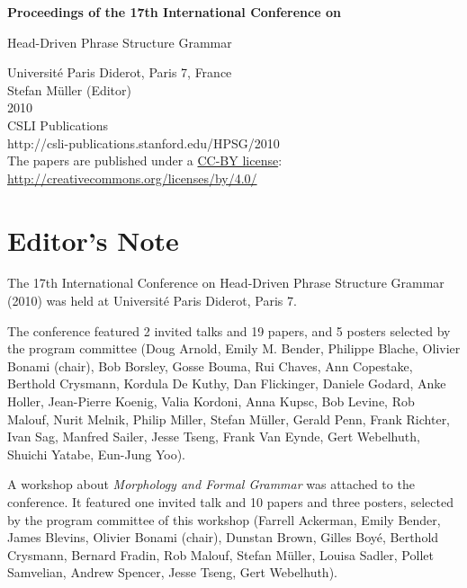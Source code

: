 \documentclass[11pt,a4paper,fleqn]{article}
\begin{document}
\begin{center}
{\Large
                {\bfseries Proceedings of the 17th International Conference on\par Head-Driven Phrase Structure Grammar\par}

                \vspace{8ex}

                     Universit{\'e} Paris Diderot, Paris 7, France\\[\baselineskip]

                        Stefan M{\"u}ller (Editor)\\[\baselineskip]

                                2010\\[\baselineskip]

                          CSLI Publications\\[\baselineskip]

              http://csli-publications.stanford.edu/HPSG/2010 \\[4\baselineskip]

The papers are published under a \href{http://creativecommons.org/licenses/by/4.0/}{CC-BY license}:\\[3pt]
\href{http://creativecommons.org/licenses/by/4.0/}{http://creativecommons.org/licenses/by/4.0/}
}
\end{center}
\newpage
\tableofcontents

\newpage

\section{Editor's Note}
The 17th International Conference on Head-Driven Phrase Structure Grammar (2010) was held at Université Paris Diderot, Paris 7.

The conference featured 2 invited talks and 19 papers, and 5 posters selected by the program committee (Doug Arnold,
Emily M. Bender, Philippe Blache, Olivier Bonami (chair), Bob Borsley, Gosse Bouma, Rui Chaves, Ann
Copestake,
Berthold Crysmann, Kordula De Kuthy, Dan Flickinger, Daniele Godard, Anke Holler, Jean-Pierre
Koenig, Valia Kordoni, Anna Kupsc, Bob Levine, Rob Malouf, Nurit Melnik, Philip Miller, Stefan
Müller, Gerald Penn, Frank Richter, Ivan Sag, Manfred Sailer, Jesse Tseng, Frank Van Eynde, Gert
Webelhuth, Shuichi Yatabe, Eun-Jung Yoo).

A workshop about \emph{Morphology and Formal Grammar}
was attached to the conference. It featured one invited talk and 10 papers and three posters, selected by the program
committee of this workshop (Farrell Ackerman,
Emily Bender,
James Blevins,
Olivier Bonami (chair),
Dunstan Brown,
Gilles Boyé,
Berthold Crysmann,
Bernard Fradin,
Rob Malouf,
Stefan Müller,
Louisa Sadler,
Pollet Samvelian,
Andrew Spencer,
Jesse Tseng,
Gert Webelhuth).
\end{document}
